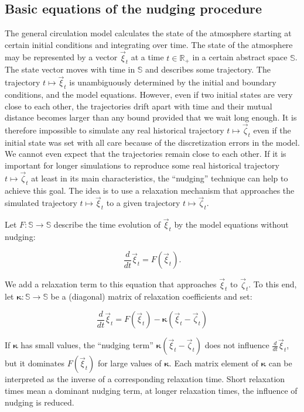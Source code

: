 \begin{appendix}
\subsection{Basic equations of the nudging procedure}

The general circulation model \echam{} calculates the state of the
atmosphere starting at certain initial conditions and integrating over
time. The state of the atmosphere may be represented by a vector
$\vec{\xi}_t$ at a time $t\in\mathbb{R}_+$ in a 
certain abstract space $\mathbb{S}$. The state vector moves with time
in $\mathbb{S}$ and describes some trajectory. 
The trajectory $t\mapsto\vec{\xi}_t$ is unambiguously determined by the
initial and boundary conditions, and the model equations. However, even if two
initial states are very close to each other, the trajectories drift
apart with time and their mutual distance becomes larger than any
bound provided that we wait long enough. It is therefore impossible to
simulate any real historical trajectory $t\mapsto\vec{\zeta}_t$ even if the
initial state was 
set with all care because of the discretization errors in the
model. We cannot even expect that the trajectories remain close to
each other.   
If it is important for longer simulations to reproduce some
real historical trajectory $t\mapsto\vec{\zeta}_t$ at least in its
main characteristics, the 
``nudging'' technique can help to achieve this goal.
The idea is to use a relaxation mechanism that approaches the
simulated trajectory $t\mapsto\vec{\xi}_t$ to a given trajectory
$t\mapsto\vec{\zeta}_t$. 

Let $F: \mathbb{S}\rightarrow\mathbb{S}$ describe the time evolution of
$\vec{\xi}_t$ by the model equations without nudging:

\begin{equation}\label{eqintfree}
\frac{d}{dt}\vec{\xi}_t=F(\vec{\xi}_t).
\end{equation}

We add a relaxation term to this
equation that approaches $\vec{\xi}_t$ to $\vec{\zeta}_t$. To this
end, let $\boldsymbol{\kappa}:\mathbb{S}\rightarrow\mathbb{S}$ be a
(diagonal) matrix of relaxation coefficients and set:

\begin{equation}\label{eqdiffnudg}
\frac{d}{dt}\vec{\xi}_t=F(\vec{\xi}_t)-\boldsymbol{\kappa}(\vec{\xi}_t-\vec{\zeta}_t)
\end{equation}

If $\boldsymbol{\kappa}$ has small values, the ``nudging term''
$\boldsymbol{\kappa}(\vec{\xi}_t-\vec{\zeta}_t)$ does not influence
$\frac{d}{dt}\vec{\xi}_t$, but it dominates $F(\vec{\xi}_t)$ for large
values of $\boldsymbol{\kappa}$. Each matrix element of
$\boldsymbol{\kappa}$ can be interpreted as the inverse of a
corresponding relaxation time. Short relaxation times mean a dominant
nudging term, at longer relaxation times, the influence of nudging is
reduced. 


\end{appendix}
